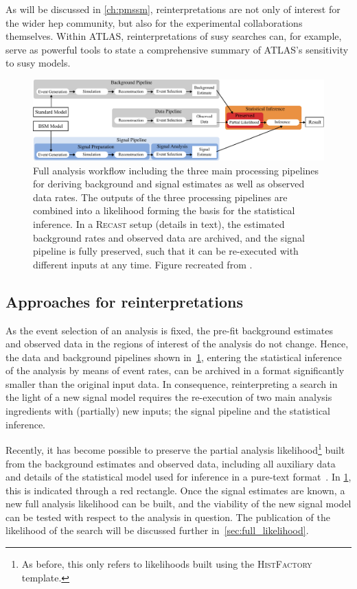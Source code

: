 As will be discussed in \cref{ch:pmssm}, reinterpretations are not only of interest for the wider \gls{hep} community, but also for the experimental collaborations themselves. Within ATLAS, reinterpretations of \gls{susy} searches can, for example, serve as powerful tools to state a comprehensive summary of ATLAS's sensitivity to \gls{susy} models.

 \begin{figure}
	\centering\includegraphics[width=\textwidth]{pipeline}
	\caption{Full analysis workflow including the three main processing pipelines for deriving background and signal estimates as well as observed data rates. The outputs of the three processing pipelines are combined into a likelihood forming the basis for the statistical inference. In a \textsc{Recast} setup (details in text), the estimated background rates and observed data are archived, and the signal pipeline is fully preserved, such that it can be re-executed with different inputs at any time. Figure recreated from \cite{ATL-PHYS-PUB-2019-032}.}
	\label{fig:pipeline_analysis}
\end{figure}

\subsection{Approaches for reinterpretations}

As the event selection of an analysis is fixed, the pre-fit background estimates and observed data in the regions of interest of the analysis do not change.
Hence, the data and background pipelines shown in~\cref{fig:pipeline_analysis}, entering the statistical inference of the analysis by means of event rates, can be archived in a format significantly smaller than the original input data.
In consequence, reinterpreting a search in the light of a new signal model requires the re-execution of two main analysis ingredients with (partially) new inputs; the signal pipeline and the statistical inference.

Recently, it has become possible to preserve the partial analysis likelihood\footnote{As before, this only refers to likelihoods built using the \textsc{HistFactory} template.} built from the background estimates and observed data, including all auxiliary data and details of the statistical model used for inference in a pure-text format~\cite{ATL-PHYS-PUB-2019-029}. In \cref{fig:pipeline_analysis}, this is indicated through a red rectangle. 
Once the signal estimates are known, a new full analysis likelihood can be built, and the viability of the new signal model can be tested with respect to the analysis in question. The publication of the likelihood of the \onelepton search will be discussed further in~\cref{sec:full_likelihood}.

